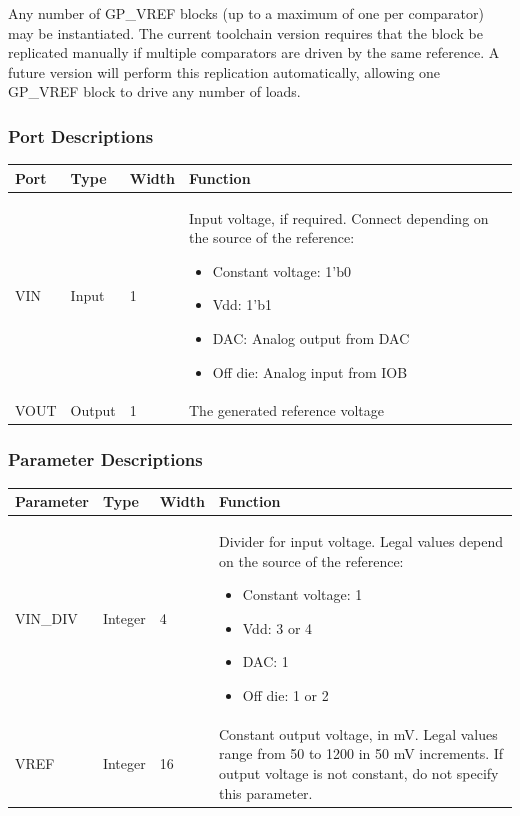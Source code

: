 \documentclass{article}
\begin{document}
Any number of GP\_VREF blocks (up to a maximum of one per comparator) may be instantiated. The current toolchain 
version requires that the block be replicated manually if multiple comparators are driven by the same reference. A 
future version will perform this replication automatically, allowing one GP\_VREF block to drive any number of loads.

\subsubsection{Port Descriptions}

\begin{tabularx}{5in}{|l|l|l|X|}
\hline
{\bfseries Port} & {\bfseries Type} & {\bfseries Width} & {\bfseries Function} \\
\hline
VIN & Input & 1 & Input voltage, if required. Connect depending on the source of the reference:
	\begin{itemize}
		\item Constant voltage: 1'b0
		\item Vdd: 1'b1
		\item DAC: Analog output from DAC
		\item Off die: Analog input from IOB
	\end{itemize}
\\
\hline
VOUT & Output & 1 & The generated reference voltage \\
\hline
\end{tabularx}

\subsubsection{Parameter Descriptions}

\begin{tabularx}{5in}{|l|l|l|X|}
\hline
{\bfseries Parameter} & {\bfseries Type} & {\bfseries Width} & {\bfseries Function} \\
\hline
VIN\_DIV & Integer & 4 &
	Divider for input voltage. Legal values depend on the source of the reference:
	\begin{itemize}
		\item Constant voltage: 1
		\item Vdd: 3 or 4
		\item DAC: 1
		\item Off die: 1 or 2
	\end{itemize}
\\
\hline 
VREF & Integer & 16 &
	Constant output voltage, in mV. Legal values range from 50 to 1200 in 50 mV increments.
	If output voltage is not constant, do not specify this parameter.\\
\hline
\end{tabularx}
\end{document}
